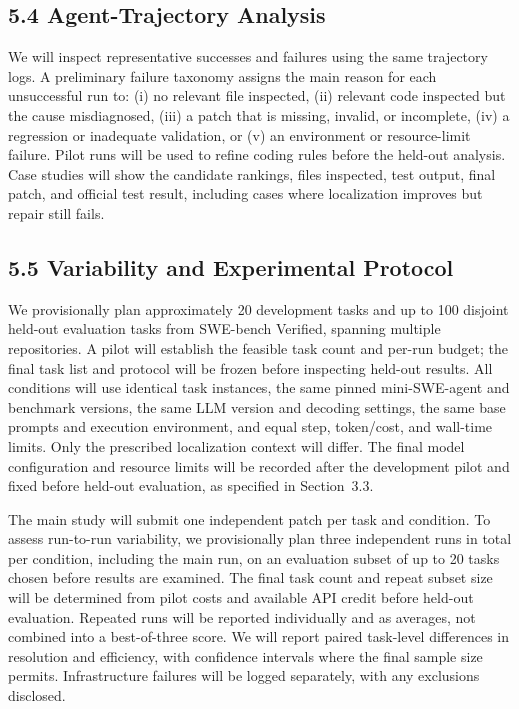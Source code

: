 \documentclass[11pt]{article}
\begin{document}
\subsection*{5.4 Agent-Trajectory Analysis}

We will inspect representative successes and failures using the same
trajectory logs. A preliminary failure taxonomy assigns the main reason
for each unsuccessful run to: (i) no relevant file inspected,
(ii) relevant code inspected but the cause misdiagnosed, (iii) a patch
that is missing, invalid, or incomplete, (iv) a regression or inadequate
validation, or (v) an environment or resource-limit failure. Pilot runs
will be used to refine coding rules before the held-out analysis. Case
studies will show the candidate rankings, files inspected, test output,
final patch, and official test result, including cases where localization
improves but repair still fails.


\subsection*{5.5 Variability and Experimental Protocol}

We provisionally plan approximately 20 development tasks and up to 100
disjoint held-out evaluation tasks from SWE-bench Verified, spanning
multiple repositories. A pilot will establish the feasible task count
and per-run budget; the final task list and protocol will be frozen
before inspecting held-out results. All conditions will use identical
task instances, the same pinned mini-SWE-agent and benchmark versions,
the same LLM version and decoding settings, the same base prompts and
execution environment, and equal step, token/cost, and wall-time limits.
Only the prescribed localization context will differ. The final model configuration and resource limits will be recorded
after the development pilot and fixed before held-out evaluation,
as specified in Section~3.3.

The main study will submit one independent patch per task and condition.
To assess run-to-run variability, we provisionally plan three independent
runs in total per condition, including the main run, on an evaluation
subset of up to 20 tasks chosen before results are examined. The final task count and repeat subset size will be determined from
pilot costs and available API credit before held-out evaluation. Repeated runs will be reported individually and as averages,
not combined into a best-of-three score. We will report paired
task-level differences in resolution and efficiency, with confidence
intervals where the final sample size permits. Infrastructure failures
will be logged separately, with any exclusions disclosed.
\end{document}

